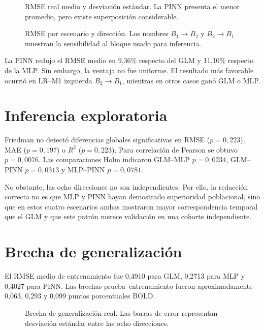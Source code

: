\begin{figure}[H]
\centering
{}
\caption{RMSE real medio y desviación estándar. La PINN presenta el menor promedio, pero existe superposición considerable.}
\label{fig:real_summary_rmse}
\end{figure}

\begin{figure}[H]
\centering
{}
\caption{RMSE por escenario y dirección. Los nombres $B_1\rightarrow B_2$ y $B_2\rightarrow B_1$ muestran la sensibilidad al bloque usado para inferencia.}
\label{fig:real_by_experiment}
\end{figure}

La PINN redujo el RMSE medio en 9,36\% respecto del GLM y 11,10\% respecto de la MLP. Sin embargo, la ventaja no fue uniforme. El resultado más favorable ocurrió en LR--M1 izquierda $B_2\rightarrow B_1$, mientras en otros casos ganó GLM o MLP.

\section{Inferencia exploratoria}
Friedman no detectó diferencias globales significativas en RMSE ($p=0{,}223$), MAE ($p=0{,}197$) o $R^2$ ($p=0{,}223$). Para correlación de Pearson se obtuvo $p=0{,}0076$. Las comparaciones Holm indicaron GLM--MLP $p=0{,}0234$, GLM--PINN $p=0{,}0313$ y MLP--PINN $p=0{,}0781$.

No obstante, las ocho direcciones no son independientes. Por ello, la redacción correcta no es que MLP y PINN hayan demostrado superioridad poblacional, sino que en estos cuatro escenarios ambas mostraron mayor correspondencia temporal que el GLM y que este patrón merece validación en una cohorte independiente.

\section{Brecha de generalización}
El RMSE medio de entrenamiento fue 0,4910 para GLM, 0,2713 para MLP y 0,4027 para PINN. Las brechas prueba--entrenamiento fueron aproximadamente 0,063, 0,293 y 0,099 puntos porcentuales BOLD.

\begin{figure}[H]
\centering
{}
\caption{Brecha de generalización real. Las barras de error representan desviación estándar entre las ocho direcciones.}
\label{fig:real_gap}
\end{figure}

